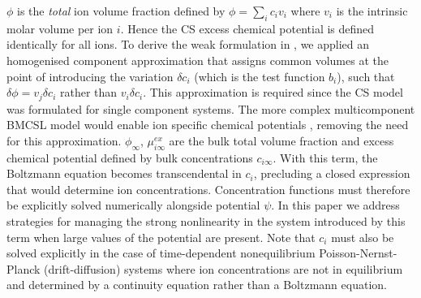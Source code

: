 $\phi$ is the \emph{total} ion volume fraction defined by
$\phi=\sum_i c_i v_i$ where $v_i$ is the intrinsic molar volume per
ion $i$. Hence the CS excess chemical potential is defined identically
for all ions. To derive the weak formulation in , we
applied an homogenised component approximation that assigns common
volumes at the point of introducing the variation  $\delta c_i$ (which
is the test function $b_i$), such that $\delta\phi=v_j \delta c_i$ rather
than $v_i \delta c_i$. This approximation is required since the CS
model was formulated for single component systems. The more complex
multicomponent BMCSL model would enable ion specific chemical
potentials \cite{MansooriCarnahanStarlingLeland1971}, removing the
need for this approximation.  $\phi_{\infty}$, $\mu_{i\infty}^{ex}$
are the bulk total volume fraction and excess chemical potential
defined by bulk concentrations $c_{i\infty}$. With this term, the
Boltzmann equation  becomes transcendental in $c_i$, precluding a closed
expression that would determine ion concentrations. Concentration functions must therefore be
explicitly solved  numerically alongside potential $\psi$. In this
paper we address strategies for managing the strong nonlinearity in
the system introduced by this term when large values of the
potential are present. Note that $c_i$ must also be solved explicitly in the case
of time-dependent nonequilibrium Poisson-Nernst-Planck (drift-diffusion) systems \cite{LopezGarciaHornoGrosse2018} where
ion concentrations are not in equilibrium and determined by a
continuity equation rather than a Boltzmann equation.

